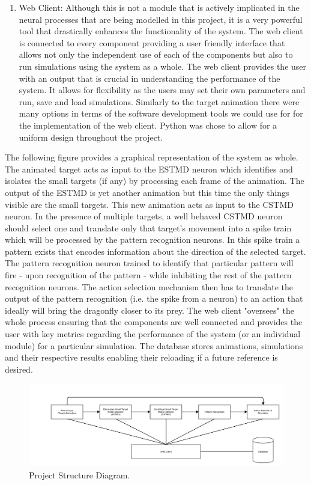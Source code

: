 \documentclass[a4paper,11pt]{article}
\begin{document}
\begin{enumerate}
\item{Web Client:} Although this is not a module that is actively implicated in the neural processes that are being modelled in this project, it is a very powerful tool that drastically enhances the functionality of the system. The web client is connected to every component providing a user friendly interface that allows not only the independent use of each of the components but also to run simulations using the system as a whole. The web client provides the user with an output that is crucial in understanding the performance of the system. It allows for flexibility as the users may set their own parameters and run, save and load simulations. Similarly to the target animation there were many options in terms of the software development tools we could use for for the implementation of the web client. Python was chose to allow for a uniform design throughout the project.
\end{enumerate}

The following figure provides a graphical representation of the system as whole. The animated target acts as input to the ESTMD neuron which identifies and isolates the small targets (if any) by processing each frame of the animation. The output of the ESTMD is yet another animation but this time the only things visible are the small targets. This new animation acts as input to the CSTMD neuron. In the presence of multiple targets, a well behaved CSTMD neuron should select one and translate only that target's movement into a spike train which will be processed by the pattern recognition neurons. In this spike train a pattern exists that encodes information about the direction of the selected target. The pattern recognition neuron trained to identify that particular pattern will fire - upon recognition of the pattern - while inhibiting the rest of the pattern recognition neurons. The action selection mechanism then has to translate the output of the pattern recognition (i.e. the spike from a neuron) to an action that ideally will bring the dragonfly closer to its prey.
The web client "oversees" the whole process ensuring that the components are well connected and provides the user with key metrics regarding the performance of the system (or an individual module) for a particular simulation. The database stores animations, simulations and their respective results enabling their reloading if a future reference is desired.

\begin{figure}[hb]
\centering
\includegraphics[scale = 0.3]{designblockdiagram}
\caption{Project Structure Diagram.}
\end{figure}
\end{document}
